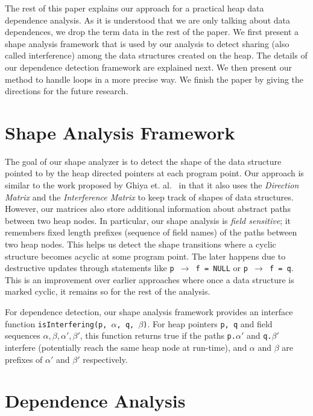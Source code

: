 \documentclass{IOS-Book-Article}
\newcommand{\isInterfering}{\mbox{isInterfering}}
\begin{document}
The rest of this paper explains our approach for a practical
heap data dependence analysis. As it is understood that we
are only talking about data dependences, we drop the term
data in the rest of the paper. We first present a shape
analysis framework that is used by our analysis to detect
sharing (also called interference) among the data
structures created on the heap.  The details of our
dependence detection framework are explained next.  We then
present our method to handle loops in a more precise way.  We
finish the paper by giving the directions for the future
research.

\section{Shape Analysis Framework}
The goal of our shape analyzer is to detect the shape of the
data structure pointed to by the heap directed pointers at
each program point. Our approach is similar to the work
proposed by Ghiya et. al.~\cite{Ghiya96Tree} in that it also
uses the {\em Direction Matrix} and the {\em Interference
  Matrix} to keep track of shapes of data
structures. However, our matrices also store additional
information about abstract paths between two heap nodes. In
particular, our shape analysis is {\em field sensitive}; it
remembers fixed length prefixes (sequence of field names) of
the paths between two heap nodes. This helps us detect the
shape transitions where a cyclic structure becomes acyclic at
some program point. The later happens due to destructive
updates through statements like {\tt p $\rightarrow$ f =
  NULL} or {\tt p $\rightarrow$ f = q}. This is an improvement
over earlier approaches where once a data structure is marked
cyclic, it remains so for the rest of the analysis.

For dependence detection, our shape analysis framework
provides an interface function {\tt \isInterfering({\tt p},
  $\alpha$, {\tt q}, $\beta$)}. For heap pointers {\tt p, q} and
field sequences $\alpha, \beta, \alpha', \beta'$, this function returns true if the
paths {\tt p.$\alpha'$} and {\tt q.$\beta'$} interfere
(potentially reach the same heap node at run-time), and
$\alpha$ and $\beta$ are prefixes of $\alpha'$ and $\beta'$
respectively.

\section{Dependence Analysis}
\end{document}
